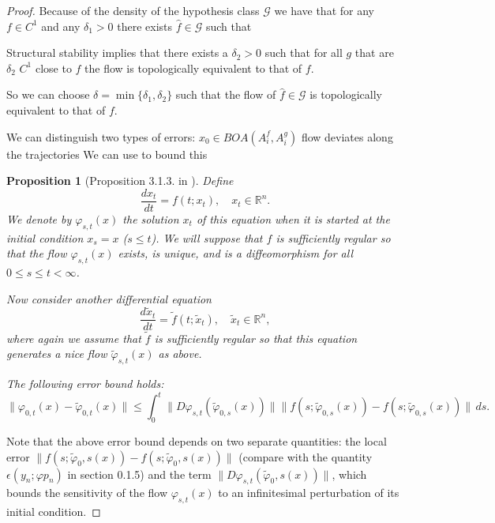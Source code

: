 \documentclass{article}
\newtheorem{proposition}{Proposition}
\theoremstyle{definition}
\theoremstyle{remark}
\begin{document}
\begin{proof}
Because of the density of the hypothesis class $\mathcal{G}$ we have that for any $f\in C^1$ and any $\delta_1>0$
there exists $\hat f\in\mathcal{G}$ such that 


Structural stability implies that there exists a $\delta_2>0$ such that for all $g$ that are $\delta_2$ $C^1$ close to $f$ the flow is topologically equivalent to that of $f$.

So we can choose $\delta = \min\{\delta_1,\delta_2\}$ such that the flow of $\hat f\in\mathcal{G}$ is topologically equivalent to that of $f$.



We can distinguish two types of errors:
$x_0\in BOA(A_i^f,A_i^g)$ flow deviates along the trajectories
We can use \citep{vanhandel2007filtering} to bound this


\begin{proposition}[Proposition 3.1.3. in \citep{vanhandel2007filtering}]
Define 
\[
\frac{d x_t}{d t} = f(t; x_t), \quad x_t \in \mathbb{R}^n.
\]
We denote by $\varphi_{s,t}(x)$ the solution $x_t$ of this equation when it is started at the initial condition $x_s = x$ ($s \leq t$). We will suppose that $f$ is sufficiently regular so that the flow $\varphi_{s,t}(x)$ exists, is unique, and is a diffeomorphism for all $0 \leq s \leq t < \infty$.

Now consider another differential equation 
\[
\frac{d \tilde{x}_t}{d t} = \tilde{f}(t; \tilde{x}_t), \quad \tilde{x}_t \in \mathbb{R}^n,
\]
where again we assume that $\tilde{f}$ is sufficiently regular so that this equation generates a nice flow $\tilde{\varphi}_{s,t}(x)$ as above.


The following error bound holds:
\[
\|\varphi_{0,t}(x) - \tilde{\varphi}_{0,t}(x)\| \leq \int_0^t \|D\varphi_{s,t}(\tilde{\varphi}_{0,s}(x))\| \|f(s; \tilde{\varphi}_{0,s}(x)) - f(s; \tilde{\varphi}_{0,s}(x))\| \, ds.
\]
\end{proposition}



Note that the above error bound depends on two separate quantities: the local error 
$\| f(s; \tilde{\varphi}_0, s(x)) - f(s; \tilde{\varphi}_0, s(x)) \|$ 
(compare with the quantity $\epsilon(y_n; \varphi p_n)$ in section 0.1.5) and the term 
$\| D\varphi_{s,t}(\tilde{\varphi}_0, s(x)) \|$, 
which bounds the sensitivity of the flow $\varphi_{s,t}(x)$ to an infinitesimal perturbation of its initial condition.




\end{proof}
\end{document}
